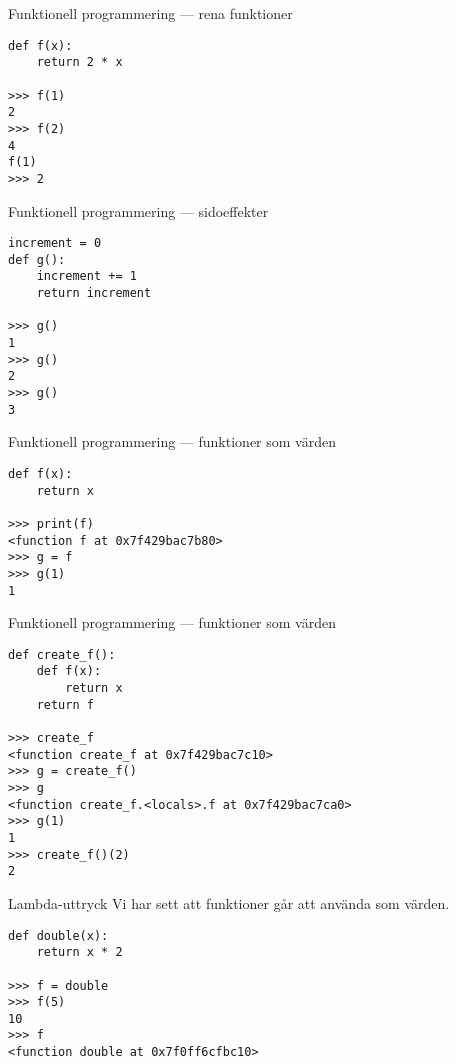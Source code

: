 \documentclass{beamer}
\begin{document}
  \begin{frame}[fragile]{Funktionell programmering --- rena funktioner}

    \begin{lstlisting}
def f(x):
    return 2 * x

>>> f(1)
2
>>> f(2)
4
f(1)
>>> 2
    \end{lstlisting}

  \end{frame}

  \begin{frame}[fragile]{Funktionell programmering --- sidoeffekter}

    \begin{lstlisting}
increment = 0
def g():
    increment += 1
    return increment

>>> g()
1
>>> g()
2
>>> g()
3
    \end{lstlisting}

  \end{frame}

  \begin{frame}[fragile]{Funktionell programmering --- funktioner som värden}

    \begin{lstlisting}
def f(x):
    return x

>>> print(f)
<function f at 0x7f429bac7b80>
>>> g = f
>>> g(1)
1
    \end{lstlisting}

  \end{frame}

  \begin{frame}[fragile]{Funktionell programmering --- funktioner som värden}

    \begin{lstlisting}
def create_f():
    def f(x):
        return x
    return f

>>> create_f
<function create_f at 0x7f429bac7c10>
>>> g = create_f()
>>> g
<function create_f.<locals>.f at 0x7f429bac7ca0>
>>> g(1)
1
>>> create_f()(2)
2
    \end{lstlisting}

  \end{frame}

  \begin{frame}[fragile]{Lambda-uttryck}
    Vi har sett att funktioner går att använda som värden.

    \begin{lstlisting}
def double(x):
    return x * 2

>>> f = double
>>> f(5)
10
>>> f
<function double at 0x7f0ff6cfbc10>
    \end{lstlisting}

  \end{frame}
\end{document}
